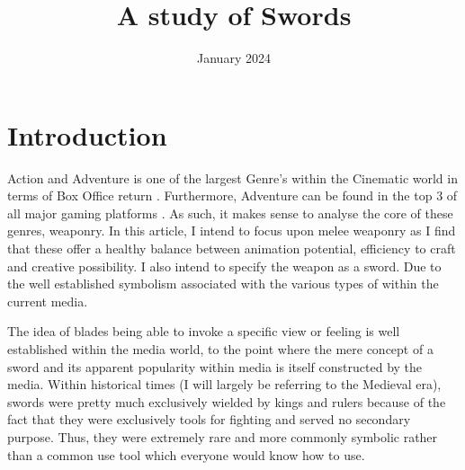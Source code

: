\documentclass{article}
\title{A study of Swords}
\date{January 2024}
\begin{document}
\maketitle

\pagebreak

\tableofcontents

\pagebreak

\section{Introduction} \label{intro}
Action and Adventure is one of the largest Genre's within the Cinematic world in terms of Box Office return \parencite{1}. Furthermore, Adventure can be found in the top 3 of all major gaming platforms \parencite{2}. As such, it makes sense to analyse the core of these genres, weaponry. In this article, I intend to focus upon melee weaponry as I find that these offer a healthy balance between animation potential, efficiency to craft and creative possibility. I also intend to specify the weapon as a sword. Due to the well established symbolism associated with the various types of within the current media.

The idea of blades being able to invoke a specific view or feeling is well established within the media world, to the point where the mere concept of a sword and its apparent popularity within media is itself constructed by the media. Within historical times (I will largely be referring to the Medieval era), swords were pretty much exclusively wielded by kings and rulers because of the fact that they were exclusively tools for fighting and served no secondary purpose. Thus, they were extremely rare and more commonly symbolic rather than a common use tool which everyone would know how to use.
\pagebreak
\end{document}
